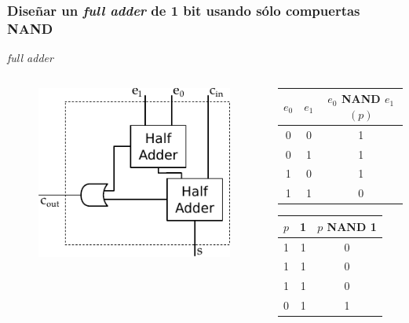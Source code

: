 \documentclass[mathserif,hyperref]{beamer}
\begin{document}
\begin{frame}
\frametitle{\small Diseñar un \textit{full adder} de 1 bit usando sólo
compuertas NAND}
\textit{full adder}
\begin{columns}[T]
  \begin{figure}[htp]
    \includegraphics[scale=0.6]{fulladder.pdf}
  \end{figure}

  \begin{center}
  \begin{tabular}{| c | c || c |}
    \hline
    $e_0$ & $e_1$ & $e_0$ NAND $e_1$ $(p)$ \\ \hline
      0   &   0   &            1           \\
      0   &   1   &            1           \\
      1   &   0   &            1           \\
      1   &   1   &            0           \\
    \hline
  \end{tabular}
  \pause
  \begin{tabular}{| c | c || c |}
    \hline
    $p$ & 1 & $p$ NAND 1 \\ \hline
     1  & 1 &      0     \\
     1  & 1 &      0     \\
     1  & 1 &      0     \\
     0  & 1 &      1     \\
    \hline
  \end{tabular}
  \end{center}
\end{columns}
\end{frame}
\end{document}
